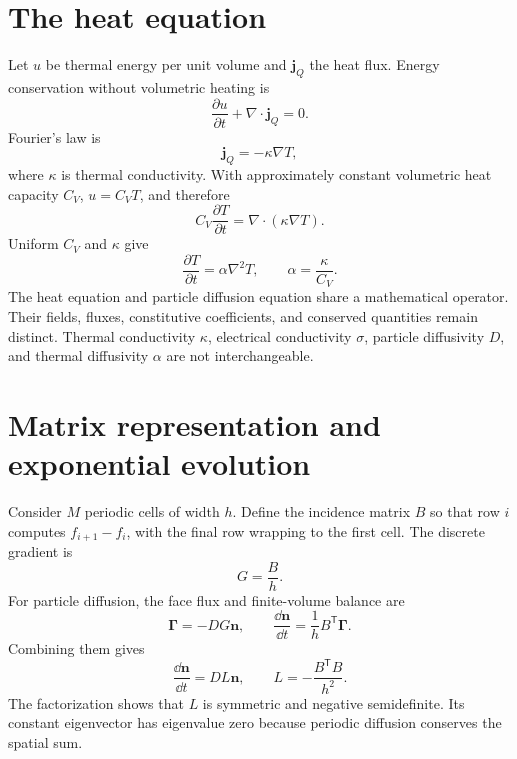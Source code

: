 \section{The heat equation}

Let $u$ be thermal energy per unit volume and $\bm j_Q$ the heat flux.  Energy
conservation without volumetric heating is
\begin{equation}
  \frac{\partial u}{\partial t}+\nabla\cdot\bm j_Q=0.
  \label{eq:transport-energy-continuity}
\end{equation}
Fourier's law is
\begin{equation}
  \bm j_Q=-\kappa\nabla T,
  \label{eq:transport-fourier-law}
\end{equation}
where $\kappa$ is thermal conductivity.  With approximately constant volumetric
heat capacity $C_V$, $u=C_VT$, and therefore
\begin{equation}
  C_V\frac{\partial T}{\partial t}
  =\nabla\cdot(\kappa\nabla T).
  \label{eq:transport-general-heat-equation}
\end{equation}
Uniform $C_V$ and $\kappa$ give
\begin{equation}
  \boxed{
  \frac{\partial T}{\partial t}=\alpha\nabla^2T,
  \qquad
  \alpha=\frac{\kappa}{C_V}.
  }
  \label{eq:transport-heat-equation}
\end{equation}
The heat equation and particle diffusion equation share a mathematical
operator.  Their fields, fluxes, constitutive coefficients, and conserved
quantities remain distinct.  Thermal conductivity $\kappa$, electrical
conductivity $\sigma$, particle diffusivity $D$, and thermal diffusivity
$\alpha$ are not interchangeable.

\section{Matrix representation and exponential evolution}

Consider $M$ periodic cells of width $h$.  Define the incidence matrix $B$ so
that row $i$ computes $f_{i+1}-f_i$, with the final row wrapping to the first
cell.  The discrete gradient is
\begin{equation}
  G=\frac{B}{h}.
  \label{eq:transport-discrete-gradient}
\end{equation}
For particle diffusion, the face flux and finite-volume balance are
\begin{equation}
  \bm\Gamma=-DG\bm n,
  \qquad
  \frac{\dd\bm n}{\dd t}=\frac1hB^{\mathsf T}\bm\Gamma.
  \label{eq:transport-discrete-flux-continuity}
\end{equation}
Combining them gives
\begin{equation}
  \frac{\dd\bm n}{\dd t}=D L\bm n,
  \qquad
  \boxed{L=-\frac{B^{\mathsf T}B}{h^2}.}
  \label{eq:transport-matrix-diffusion}
\end{equation}
The factorization shows that $L$ is symmetric and negative semidefinite.  Its
constant eigenvector has eigenvalue zero because periodic diffusion conserves
the spatial sum.

